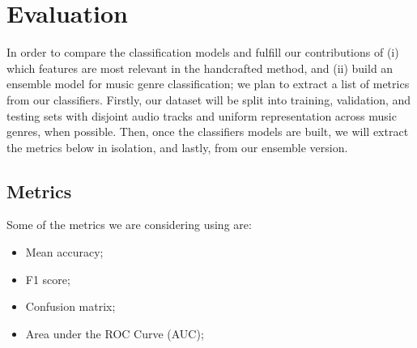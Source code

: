 \section{Evaluation}

In order to compare the classification models and fulfill our contributions of (i) which features are most relevant in the handcrafted method, and (ii) build an ensemble model for music genre classification; we plan to extract a list of metrics from our classifiers. Firstly, our dataset will be split into training, validation, and testing sets with disjoint audio tracks and uniform representation across music genres, when possible. Then, once the classifiers models are built, we will extract the metrics below in isolation, and lastly, from our ensemble version.

\subsection{Metrics}

Some of the metrics we are considering using are:

\begin{itemize}
    \item Mean accuracy;
    \item F1 score;
    \item Confusion matrix;
    \item Area under the ROC Curve (AUC); %
\end{itemize}
